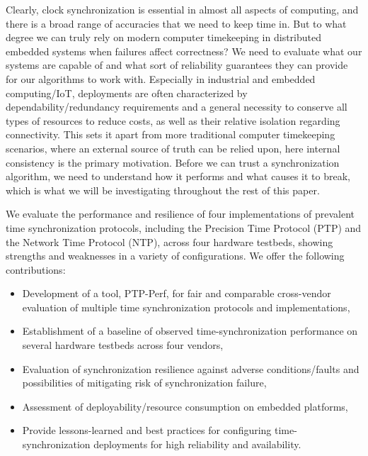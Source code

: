 Clearly, clock synchronization is essential in almost all aspects of computing, and there is a broad range of accuracies that we need to keep time in. But to what degree we can truly rely on modern computer timekeeping in distributed embedded systems when failures affect correctness?
We need to evaluate what our systems are capable of and what sort of reliability guarantees they can provide for our algorithms to work with.
Especially in industrial and embedded computing/IoT, deployments are often characterized by dependability/redundancy requirements and a general necessity to conserve all types of resources to reduce costs, as well as their relative isolation regarding connectivity.
This sets it apart from more traditional computer timekeeping scenarios, where an external source of truth can be relied upon, here internal consistency is the primary motivation.
Before we can trust a synchronization algorithm, we need to understand how it performs and what causes it to break, which is what we will be investigating throughout the rest of this paper.


We evaluate the performance and resilience of four implementations of prevalent time synchronization protocols, including the Precision Time Protocol (PTP) and the Network Time Protocol (NTP), across four hardware testbeds, showing strengths and weaknesses in a variety of configurations. We offer the following contributions:

\begin{itemize}
    \item Development of a tool, PTP-Perf, for fair and comparable cross-vendor evaluation of multiple time synchronization protocols and implementations,
    \item Establishment of a baseline of observed time-synchronization performance on several hardware testbeds across four vendors,
    \item Evaluation of synchronization resilience against adverse conditions/faults and possibilities of mitigating risk of synchronization failure,
    \item Assessment of deployability/resource consumption on embedded platforms,
    \item Provide lessons-learned and best practices for configuring time-synchronization deployments for high reliability and availability.
\end{itemize}

